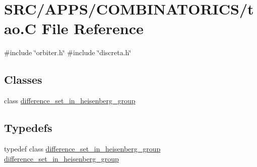 \hypertarget{tao_8_c}{}\section{S\+R\+C/\+A\+P\+P\+S/\+C\+O\+M\+B\+I\+N\+A\+T\+O\+R\+I\+C\+S/tao.C File Reference}
\label{tao_8_c}
{\ttfamily \#include \char`\"{}orbiter.\+h\char`\"{}}\newline
{\ttfamily \#include \char`\"{}discreta.\+h\char`\"{}}\newline
\subsection*{Classes}
\begin{DoxyCompactItemize}
\item 
class \mbox{\hyperlink{classdifference__set__in__heisenberg__group}{difference\+\_\+set\+\_\+in\+\_\+heisenberg\+\_\+group}}
\end{DoxyCompactItemize}
\subsection*{Typedefs}
\begin{DoxyCompactItemize}
\item 
typedef class \mbox{\hyperlink{classdifference__set__in__heisenberg__group}{difference\+\_\+set\+\_\+in\+\_\+heisenberg\+\_\+group}} \mbox{\hyperlink{tao_8_c_aad314b371dabdcf621b78db5725d099e}{difference\+\_\+set\+\_\+in\+\_\+heisenberg\+\_\+group}}
\end{DoxyCompactItemize}
